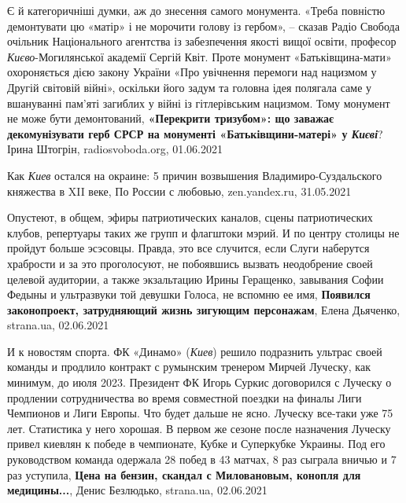 Є й категоричніші думки, аж до знесення самого монумента. «Треба повністю
демонтувати цю «матір» і не морочити голову із гербом», – сказав Радіо Свобода
очільник Національного агентства із забезпечення якості вищої освіти, професор
\emph{Києво}-Могилянської академії Сергій Квіт.  Проте монумент
«Батьківщина-мати» охороняється дією закону України «Про увічнення перемоги над
нацизмом у Другій світовій війні», оскільки його задум та головна ідея полягала
саме у вшануванні пам'яті загиблих у війні із гітлерівським нацизмом. Тому
монумент не може бути демонтований,
\textbf{«Перекрити тризубом»: що заважає декомунізувати герб СРСР на монументі «Батьківщини-матері» у \emph{Києві}}?
Ірина Штогрін, radiosvoboda.org, 01.06.2021

Как \emph{Киев} остался на окраине: 5 причин возвышения Владимиро-Суздальского княжества в XII веке,
По России с любовью, zen.yandex.ru, 31.05.2021

Опустеют, в общем, эфиры патриотических каналов, сцены патриотических клубов,
репертуары таких же групп и флагштоки мэрий. И по центру столицы не пройдут
больше эсэсовцы. Правда, это все случится, если Слуги наберутся храбрости и за
это проголосуют, не побоявшись вызвать неодобрение своей целевой аудитории, а
также экзальтацию Ирины Геращенко, завывания Софии Федыны и ультразвуки той
девушки Голоса, не вспомню ее имя,
\textbf{Появился законопроект, затрудняющий жизнь зигующим персонажам}, Елена Дьяченко, strana.ua, 02.06.2021

И к новостям спорта. ФК «Динамо» (\emph{Киев}) решило подразнить ультрас своей команды
и продлило контракт с румынским тренером Мирчей Луческу, как минимум, до июля
2023. Президент ФК Игорь Суркис договорился с Луческу о продлении
сотрудничества во время совместной поездки на финалы Лиги Чемпионов и Лиги
Европы. Что будет дальше не ясно. Луческу все-таки уже 75 лет. Статистика у
него хорошая. В первом же сезоне после назначения Луческу привел киевлян к
победе в чемпионате, Кубке и Суперкубке Украины. Под его руководством команда
одержала 28 побед в 43 матчах, 8 раз сыграла вничью и 7 раз уступила,
\textbf{Цена на бензин, скандал с Миловановым, конопля для медицины...}, Денис Безлюдько, strana.ua, 02.06.2021

